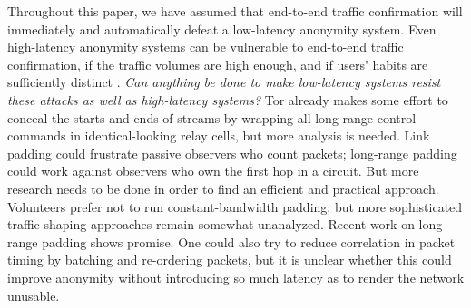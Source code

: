 \documentclass[times,10pt,twocolumn]{article}
\begin{document}
%

Throughout this paper, we have assumed that end-to-end traffic
confirmation will immediately and automatically defeat a low-latency
anonymity system. Even high-latency anonymity
systems can be vulnerable to end-to-end traffic confirmation, if the
traffic volumes are high enough, and if users' habits are sufficiently
distinct \cite{limits-open,statistical-disclosure}.  \emph{Can
  anything be done to make low-latency systems resist these attacks as
  well as high-latency systems?}
Tor already makes some effort to conceal the starts and
ends of streams by wrapping all long-range control commands in
identical-looking relay cells, but more analysis is needed.  Link
padding could frustrate passive observers who count packets; long-range
padding could work against observers who own the first hop in a
circuit.  But more research needs to be done in order to find an
efficient and practical approach.  Volunteers prefer not to run
constant-bandwidth padding; but more sophisticated traffic shaping
approaches remain somewhat unanalyzed. 
Recent work
on long-range padding \cite{defensive-dropping} shows promise.  One
could also try to reduce correlation in packet timing by batching and
re-ordering packets, but it is unclear whether this could improve
anonymity without introducing so much latency as to render the
network unusable.
\end{document}
